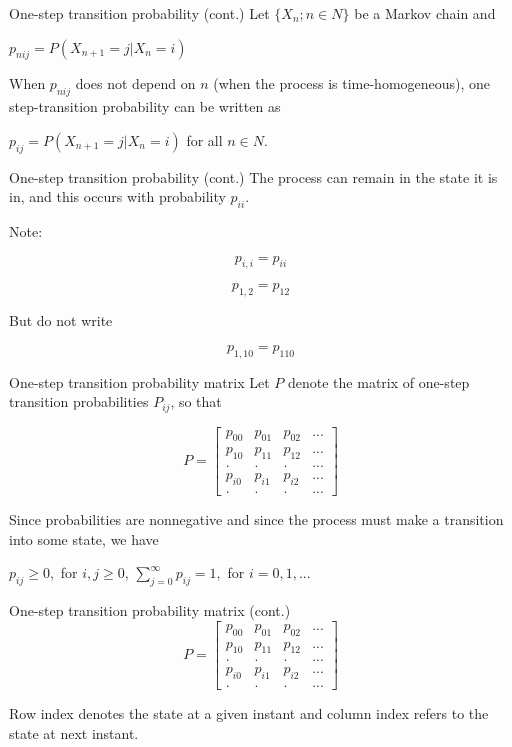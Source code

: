 \documentclass[12pt,ignorenonframetext,]{beamer}
\begin{document}
\begin{frame}{One-step transition probability (cont.)}
\protect\hypertarget{one-step-transition-probability-cont.}{}
Let \(\{X_n; n \in N\}\) be a Markov chain and

\(p_{nij} = P(X_{n+1}=j|X_n=i)\)

When \(p_{nij}\) does not depend on \(n\) (when the process is
time-homogeneous), one step-transition probability can be written as

\(p_{ij} = P(X_{n+1}=j|X_n=i)\) for all \(n \in N\).
\end{frame}

\begin{frame}{One-step transition probability (cont.)}
\protect\hypertarget{one-step-transition-probability-cont.-1}{}
The process can remain in the state it is in, and this occurs with
probability \(p_{ii}\).

Note:

\[p_{i,i} = p_{ii}\]

\[p_{1,2} = p_{12}\]

But do not write

\[p_{1,10} = p_{110}\]
\end{frame}

\begin{frame}{One-step transition probability matrix}
\protect\hypertarget{one-step-transition-probability-matrix}{}
Let \(P\) denote the matrix of one-step transition probabilities
\(P_{ij}\), so that

\[P = \left[\begin{array}{cccccccc}
p_{00} & p_{01} & p_{02} & ...\\
p_{10} & p_{11} & p_{12} & ...\\
. & . & . & ...\\
p_{i0} & p_{i1} & p_{i2} & ...\\
. & . & . & ...
\end{array}\right]\]

Since probabilities are nonnegative and since the process must make a
transition into some state, we have

\(p_{ij} \geq 0,\) for \(i, j \geq 0\),
\(\sum_{j=0}^\infty p_{ij} = 1,\) for \(i = 0, 1, ...\)
\end{frame}

\begin{frame}{One-step transition probability matrix (cont.)}
\protect\hypertarget{one-step-transition-probability-matrix-cont.}{}
\[P = \left[\begin{array}{cccccccc}
p_{00} & p_{01} & p_{02} & ...\\
p_{10} & p_{11} & p_{12} & ...\\
. & . & . & ...\\
p_{i0} & p_{i1} & p_{i2} & ...\\
. & . & . & ...
\end{array}\right]\]

Row index denotes the state at a given instant and column index refers
to the state at next instant.
\end{frame}
\end{document}
